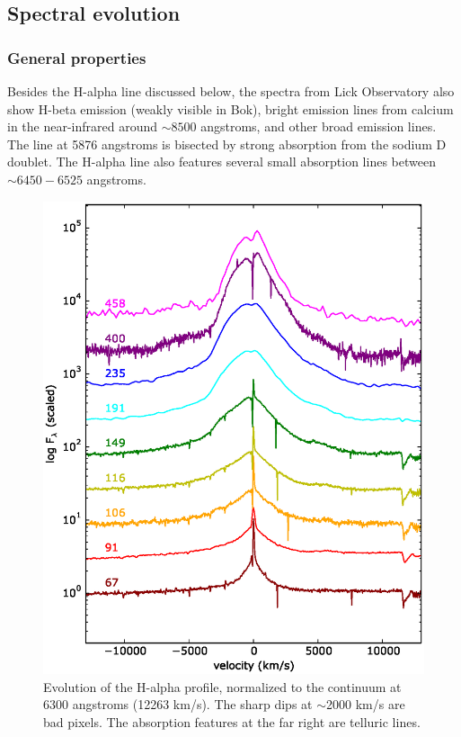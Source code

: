 \documentclass[a4paper,fleqn,usenatbib]{mnras}
\begin{document}
\subsection{Spectral evolution} \label{analysis:spec}
\subsubsection{General properties} \label{analysis:spec:gen}
Besides the H-alpha line discussed below, the spectra from Lick Observatory also show H-beta emission (weakly visible in Bok), bright emission lines from calcium in the near-infrared around $\sim8500$ angstroms, and other broad emission lines. The line at 5876 angstroms is bisected by strong absorption from the sodium D doublet. The H-alpha line also features several small absorption lines between $\sim6450-6525$ angstroms.

\begin{figure}
  \includegraphics[width=\linewidth]{graphics/H_alpha.eps}
  \caption{Evolution of the H-alpha profile, normalized to the continuum at 6300 angstroms (12263 km/s). The sharp dips at $\sim$2000 km/s are bad pixels. The absorption features at the far right are telluric lines.}
  \label{fig:H-alpha}
\end{figure}
\end{document}
